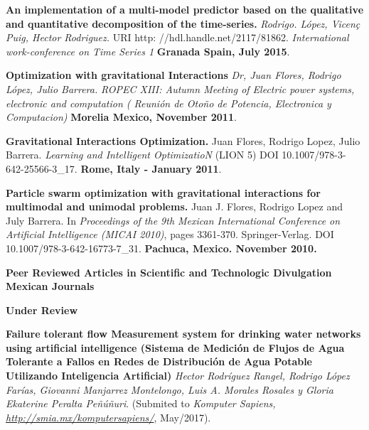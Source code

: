 \documentclass[10pt]{article}
\newenvironment{innerlist}[1][\enskip\textbullet]%
        {\begin{compactitem}[#1]}{\end{compactitem}}
\newcommand{\blankline}{\quad\pagebreak[2]}
\begin{document}
\begin{innerlist}
\item \textbf{An implementation of a multi-model predictor based on the qualitative and quantitative decomposition of the time-series.} \textit{Rodrigo. López, Vicen\c{c} Puig, Hector Rodriguez.} URI http: //hdl.handle.net/2117/81862. \textit{International work-conference on Time Series 1 
} \textbf{Granada Spain, July 2015}.

\item \textbf{Optimization with gravitational Interactions} \textit{Dr, Juan Flores, Rodrigo López, Julio Barrera.}   \textit{ROPEC XIII: Autumn Meeting of Electric power systems, electronic and computation ( Reunión de Oto\~no de Potencia, Electronica y Computacion)} \textbf{ Morelia Mexico, November 2011}.

\item \textbf{Gravitational Interactions Optimization.} Juan Flores, Rodrigo Lopez, Julio Barrera.  \textit{Learning and Intelligent OptimizatioN}  (LION 5) DOI 10.1007/978-3-642-25566-3\_17. \textbf{Rome, Italy - January 2011}. 

\item \textbf{Particle swarm optimization with gravitational interactions for multimodal and unimodal problems.} Juan J. Flores, Rodrigo Lopez and July Barrera.  In \textit{Proceedings of the 9th Mexican International Conference on Artificial Intelligence (MICAI 2010)}, pages 3361-370. Springer-Verlag. DOI 10.1007/978-3-642-16773-7\_31. \textbf{Pachuca, Mexico. November 2010.}

\end{innerlist}

\blankline

\textbf{Peer Reviewed Articles in Scientific and Technologic Divulgation Mexican Journals }

\textbf{Under Review}
\begin{innerlist}
\item \textbf{Failure tolerant flow Measurement system for drinking water networks using artificial intelligence (Sistema de Medición de Flujos de Agua Tolerante a
Fallos en Redes de Distribución de Agua Potable
Utilizando Inteligencia Artificial)} \textit{Hector Rodríguez Rangel, Rodrigo López Farías, Giovanni Manjarrez Montelongo, Luis A. Morales Rosales y Gloria Ekaterine Peralta Peñúñuri}.   (Submited to \textit{Komputer Sapiens, \url{http://smia.mx/komputersapiens/}}, May/2017).
\end{innerlist}
\end{document}
